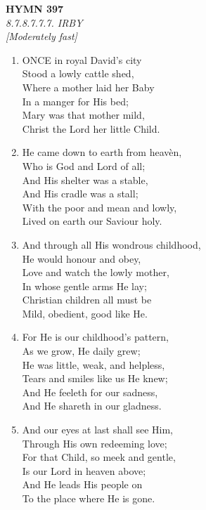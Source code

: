 \documentclass[11pt,a4paper]{article}
\begin{document}
\newpage
\begin{center}
    {\Large \textbf{HYMN 397}}
    \\
    \textit{8.7.8.7.7.7. IRBY}
    \\
    \textit{\small [Moderately fast]}
\end{center}
\vspace{1em}

\begin{enumerate}
    \item ONCE in royal David's city \\
        Stood a lowly cattle shed, \\
        Where a mother laid her Baby \\
        In a manger for His bed; \\
        Mary was that mother mild, \\
        Christ the Lord her little Child.

    \item He came down to earth from heav\`en, \\
        Who is God and Lord of all; \\
        And His shelter was a stable, \\
        And His cradle was a stall; \\
        With the poor and mean and lowly, \\
        Lived on earth our Saviour holy.

    \item And through all His wondrous childhood, \\
        He would honour and obey, \\
        Love and watch the lowly mother, \\
        In whose gentle arms He lay; \\
        Christian children all must be \\
        Mild, obedient, good like He.

    \item For He is our childhood's pattern, \\
        As we grow, He daily grew; \\
        He was little, weak, and helpless, \\
        Tears and smiles like us He knew; \\
        And He feeleth for our sadness, \\
        And He shareth in our gladness.

    \item And our eyes at last shall see Him, \\
        Through His own redeeming love; \\
        For that Child, so meek and gentle, \\
        Is our Lord in heaven above; \\
        And He leads His people on \\
        To the place where He is gone.


\end{enumerate}
\end{document}
